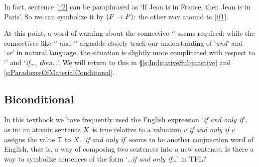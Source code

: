 In fact, sentence \ref{if2} can be paraphrased as `If Jean is in France, then Jean is in Paris'. So we can symbolize it by $(F \rightarrow P)$: the other way around to \ref{if1}.

\noindent At this point, a word of warning about the connective `\eif'  seems required: while the connectives like `\eand' and `\eor' arguable closely track our understanding of `\emph{and}' and `\emph{or}' in natural language, the situation is slightly more complicated with respect to `\eif' and `\emph{if\ldots, then\ldots}'. We will return to this in \S\ref{s:IndicativeSubjunctive} and \ref{s:ParadoxesOfMaterialConditional}.

\subsection{Biconditional}
In this textbook we have frequently used the English expression `\emph{if and only if}', as in: an atomic sentence $X$ is true relative to a valuation $v$ \emph{if and only if} $v$ assigns the value T to $X$. `\emph{if and only if}' seems to be another conjunction word of English, that is, a way of composing two sentences into a new sentence. Is there a way to symbolize sentences of the form `\emph{\ldots if and only if\ldots}' in TFL?


